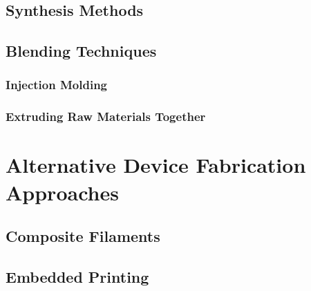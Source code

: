 \subsection{Synthesis Methods\label{sec:literatureReview:PLCL:synthesis}}

\subsection{Blending Techniques\label{sec:literatureReview:PLCL:blending}}

\subsubsection{Injection Molding\label{sec:literatureReview:PLCL:blending:injectionMolding}}

\subsubsection{Extruding Raw Materials Together\label{sec:literatureReview:PLCL:blending:coextrusion}}

\section{Alternative Device Fabrication Approaches\label{sec:literatureReview:alternativeDevices}}

\subsection{Composite Filaments\label{sec:literatureReview:alternativeDevices:compositeFilaments}}

\subsection{Embedded Printing\label{sec:literatureReview:alternativeDevices:embeddedPrinting}}

